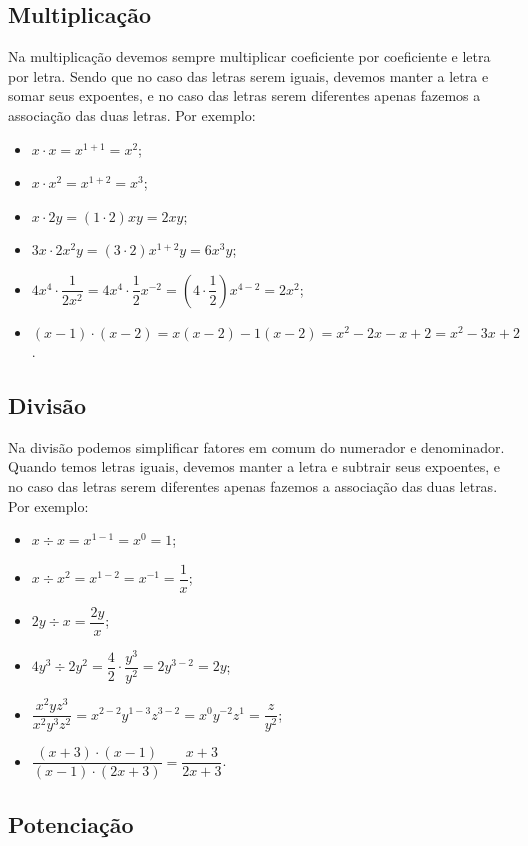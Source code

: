  \subsection{Multiplicação}

 Na multiplicação devemos sempre multiplicar coeficiente por coeficiente e letra por letra. Sendo que no caso das letras serem iguais, devemos manter a letra e somar seus expoentes, e no caso das letras serem diferentes apenas fazemos a associação das duas letras. Por exemplo:

  \begin{itemize}
   \item $x \cdot x = x^{1+1}= x^2$;
   \item $x \cdot x^2= x^{1+2}= x^3$;
   \item $x \cdot 2y= (1 \cdot 2)xy= 2xy$;
   \item $3x \cdot 2x^2y= (3 \cdot 2)x^{1+2}y= 6x^3y$;
   \item $4x^4 \cdot \dfrac{1}{2x^{2}}= 4x^4 \cdot \dfrac{1}{2}x^{-2}= (4 \cdot \dfrac{1}{2})x^{4-2}= 2x^2$;
   \item $(x - 1) \cdot (x - 2)= x(x-2) - 1(x-2)= x^2 -2x -x +2= x^2 - 3x + 2$.
  \end{itemize}

   \subsection{Divisão}

   Na divisão podemos simplificar fatores em comum do numerador e denominador. Quando temos letras iguais, devemos manter a letra e subtrair seus expoentes, e no caso das letras serem diferentes apenas fazemos a associação das duas letras. Por exemplo:

  \begin{itemize}
   \item $x \div x= x^{1-1}= x^0= 1$;
   \item $x \div x^2= x^{1-2}= x^{-1}= \dfrac{1}{x}$;
   \item $2y \div x= \dfrac{2y}{x}$;
   \item $4y^3 \div 2y^2= \dfrac{4}{2} \cdot \dfrac{y^3}{y^2}= 2y^{3-2}= 2y$;
   \item $\dfrac{x^2yz^3}{x^2y^3z^2}= x^{2-2}y^{1-3}z^{3-2}= x^0 y^{-2}z^{1}= \dfrac{z}{y^2}$;
   \item $\dfrac{(x+3) \cdot (x-1)}{(x-1)\cdot (2x+3)}= \dfrac{x+3}{2x+3}$.
  \end{itemize}


  \subsection{Potenciação}

